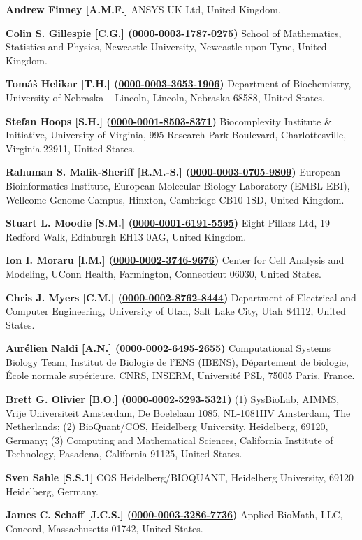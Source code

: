 \documentclass{sbml-paper}
\newcommand{\orcid}[1]{\href{https://orcid.org/#1}{#1}}
\begin{document}
\textbf{Andrew Finney [A.M.F.]} ANSYS UK Ltd, United Kingdom.
	
\textbf{Colin S. Gillespie [C.G.] (\orcid{0000-0003-1787-0275})} School of Mathematics, Statistics and Physics, Newcastle University, Newcastle upon Tyne, United Kingdom.

\textbf{Tom\'{a}\v{s} Helikar [T.H.] (\orcid{0000-0003-3653-1906})} Department of Biochemistry, University of Nebraska -- Lincoln, Lincoln, Nebraska 68588, United States.

\textbf{Stefan Hoops [S.H.] (\orcid{0000-0001-8503-8371})} Biocomplexity Institute \& Initiative, University of Virginia, 995 Research Park Boulevard, Charlottesville, Virginia 22911, United States.

\textbf{Rahuman S. Malik-Sheriff [R.M.-S.] (\orcid{0000-0003-0705-9809})} European Bioinformatics Institute, European Molecular Biology Laboratory (EMBL-EBI), Wellcome Genome Campus, Hinxton, Cambridge CB10 1SD, United Kingdom.

\textbf{Stuart L. Moodie [S.M.] (\orcid{0000-0001-6191-5595})} Eight Pillars Ltd, 19 Redford Walk, Edinburgh EH13 0AG, United Kingdom.

\textbf{Ion I. Moraru [I.M.] (\orcid{0000-0002-3746-9676})} Center for Cell Analysis and Modeling, UConn Health, Farmington, Connecticut 06030, United States.

\textbf{Chris J. Myers [C.M.] (\orcid{0000-0002-8762-8444})} Department of Electrical and Computer Engineering, University of Utah, Salt Lake City, Utah 84112, United States.

\textbf{Aur\'{e}lien Naldi [A.N.] (\orcid{0000-0002-6495-2655})} Computational Systems Biology Team, Institut de Biologie de l’ENS (IBENS), D\'{e}partement de biologie, \'{E}cole normale sup\'{e}rieure, CNRS, INSERM, Universit\'{e} PSL, 75005 Paris, France.

\textbf{Brett G. Olivier [B.O.] (\orcid{0000-0002-5293-5321})} (1) SysBioLab, AIMMS, Vrije Universiteit Amsterdam, De Boelelaan 1085, NL-1081HV Amsterdam, The Netherlands; (2) BioQuant/COS, Heidelberg University, Heidelberg, 69120, Germany; (3) Computing and Mathematical Sciences, California Institute of Technology, Pasadena, California 91125, United States.

\textbf{Sven Sahle [S.S.1]} COS Heidelberg/BIOQUANT,  Heidelberg University, 69120 Heidelberg, Germany.

\textbf{James C. Schaff [J.C.S.] (\orcid{0000-0003-3286-7736})} Applied BioMath, LLC, Concord, Massachusetts 01742, United States.
\end{document}
